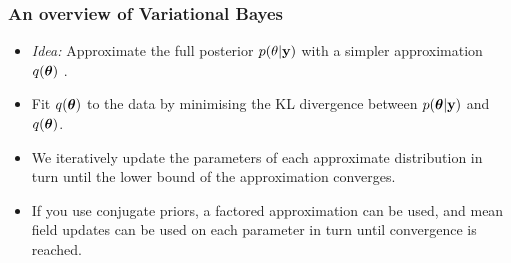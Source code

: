 \documentclass{beamer}
\begin{document}
\begin{frame}
	\frametitle{An overview of Variational Bayes}
	\begin{itemize}
		\item \emph{Idea:} Approximate the full posterior $p(\theta|{\bf y})$ with a simpler approximation $q({\boldsymbol \theta})$
					\cite{Ormerod2010}.
		      		      		      		      		      		      		      
		\item Fit $q({\boldsymbol \theta})$ to the data by minimising the KL divergence between $p({\boldsymbol \theta}|{\bf y})$ and $q({\boldsymbol \theta})$.
		      		      		      		      		      		      		      
		\item We iteratively update the parameters of each approximate distribution
		      in turn until the lower bound of the approximation converges.
		      
		      		      		      		      		      		      		      
		      		      		      		      		      		      		      
		\item If you use conjugate priors, a factored approximation can be used, and mean field updates can be used on
		      each parameter in turn until convergence is reached.
	\end{itemize}
\end{frame}

						
\end{document}
